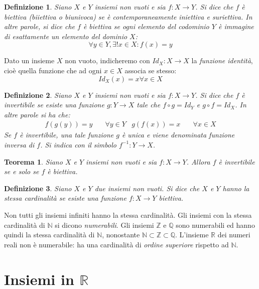 \documentclass[11pt]{book}
\newtheorem{theorem}{Teorema}[chapter]
\newtheorem{definition}{Definizione}[chapter]
\begin{document}
\begin{definition}
    Siano $X$ e $Y$ insiemi non vuoti e sia $f:X\rightarrow Y$. Si dice che $f$ è biettiva (biiettiva o biunivoca) se è 
    contemporaneamente iniettiva e suriettiva. In altre parole, si dice che $f$ è biettiva se ogni elemento del codominio
    $Y$ è immagine di esattamente un elemento del dominio $X$:
    \begin{equation*}
        \forall y\in Y,\exists !x\in X:f(x)=y
    \end{equation*}
\end{definition}
Dato un insieme $X$ non vuoto, indicheremo con $Id_X:X\rightarrow X$ la \textit{funzione identità}, cioè quella funzione 
che ad ogni $x\in X$ associa se stesso:
\begin{equation*}
    Id_X(x)=x \forall x\in X
\end{equation*}
\begin{definition}
    Siano $X$ e $Y$ insiemi non vuoti e sia $f:X\rightarrow Y$. Si dice che $f$ è invertibile se esiste una funzione 
    $g:Y\rightarrow X$ tale che $f\circ g=Id_Y$ e $g\circ f=Id_X$. In altre parole si ha che:
    \begin{align*}
        f(g(y))=y\quad&\forall y\in Y &  g(f(x))=x\quad&\forall x\in X
    \end{align*}
    Se $f$ è invertibile, una tale funzione $g$ è unica e viene denominata funzione inversa di $f$. Si indica con il 
    simbolo $f^{-1}:Y\rightarrow X$.
\end{definition}
\begin{theorem}
    Siano $X$ e $Y$ insiemi non vuoti e sia $f:X\rightarrow Y$. Allora $f$ è invertibile se e solo se $f$ è biettiva.
\end{theorem}
\begin{definition}
    Siano $X$ e $Y$ due insiemi non vuoti. Si dice che $X$ e $Y$ hanno la stessa cardinalità se esiste una funzione 
    $f:X\rightarrow Y$ biettiva.
\end{definition}
Non tutti gli insiemi infiniti hanno la stessa cardinalità. Gli insiemi con la stessa cardinalità di $\mathbb{N}$ si 
dicono \textit{numerabili}. Gli insiemi $\mathbb{Z}$ e $\mathbb{Q}$ sono numerabili ed hanno quindi la stessa cardinalità 
di $\mathbb{N}$, nonostante $\mathbb{N}\subset\mathbb{Z}\subset\mathbb{Q}$. L'insieme $\mathbb{R}$ dei numeri reali non 
è numerabile: ha una cardinalità di \textit{ordine superiore} rispetto ad $\mathbb{N}$.
\chapter{Insiemi in $\mathbb{R}$}
\end{document}
